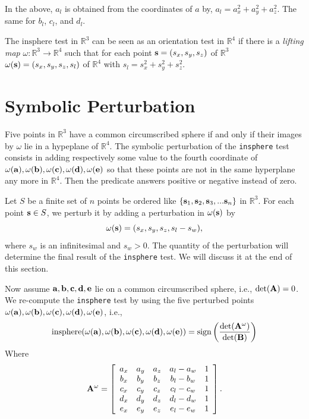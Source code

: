 In the above, $a_l$ is obtained from the coordinates of $a$ by,
$a_l = a_x^2 + a_y^2 + a_z^2$.  The same for $b_l$, $c_l$, and $d_l$.

The $\textrm{insphere}$ test in $\mathbb{R}^3$ can be seen as an orientation test in $\mathbb{R}^4$ if there is a {\it lifting map} $\omega: \mathbb{R}^3 \to \mathbb{R}^4$ such that for each point ${\bf s} = (s_x, s_y, s_z)$ of $\mathbb{R}^3$ $\omega({\bf s}) = (s_x, s_y, s_z, s_l)$ of $\mathbb{R}^4$ with $s_l = s_x^2 + s_y^2 + s_z^2$.

\section{Symbolic Perturbation}

Five points in $\mathbb{R}^3$ have a common circumscribed sphere if and only if their images by $\omega$ lie in a hypeplane of $\mathbb{R}^4$. The symbolic perturbation of the {\tt insphere} test consists in adding respectively some value to the fourth coordinate of $\omega({\bf a}), \omega({\bf b}), \omega({\bf c}), \omega({\bf d}), \omega({\bf e})$ so that these points are not in the same hyperplane any more in $\mathbb{R}^4$. Then the predicate answers positive or negative instead of zero.

Let $S$ be a finite set of $n$ points be ordered like $\{{\bf s}_1, {\bf s}_2, {\bf s}_3, ... {\bf s}_{n}\}$ in $\mathbb{R}^3$. For each point ${\bf s} \in S$, we perturb it by adding a perturbation in $\omega({\bf s})$ by
\begin{equation}
\omega({\bf s}) = (s_{x}, s_{y}, s_{z}, s_{l}-s_{w}),
\end{equation}
where $s_w$ is an infinitesimal and $s_w > 0$. The quantity of the perturbation will determine the final result of the {\tt insphere} test. We will discuss it at the end of this section.

Now assume ${\bf a}, {\bf b}, {\bf c}, {\bf d}, {\bf e}$ lie on a common circumscribed sphere, i.e., $\textrm{det}({\bf A}) = 0$. We re-compute the {\tt insphere} test by using the five perturbed points $\omega({\bf a}), \omega({\bf b}), \omega({\bf c}), \omega({\bf d}), \omega({\bf e})$, i.e., 
\[
  \textrm{insphere}(\omega({\bf a}), \omega({\bf b}), \omega({\bf c}), \omega({\bf d}), \omega({\bf e})) = \textrm{sign}\left(\frac{\textrm{det}({\bf A}^{\omega})}{\textrm{det}({\bf B})}\right)
\]
Where
\begin{equation}
  {\bf A}^{\omega} = \left[\begin{array}{ccccc}
      a_x & a_y & a_z & a_l - a_w & 1\\
      b_x & b_y & b_z & b_l - b_w & 1\\
      c_x & c_y & c_z & c_l - c_w & 1\\
      d_x & d_y & d_z & d_l - d_w & 1\\
      e_x & e_y & e_z & e_l - e_w & 1 
      \end{array}\right].
\end{equation}

